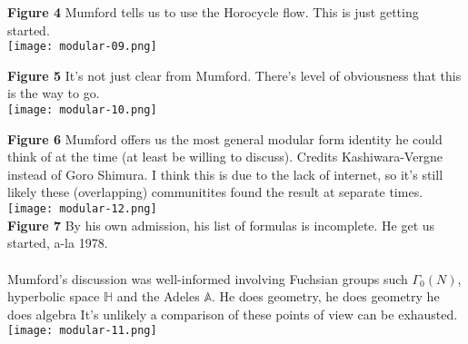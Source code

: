 \documentclass[12pt]{article}
\begin{document}
\noindent \textbf{Figure 4}  Mumford tells us to use the Horocycle flow. This is just getting started. \\
\texttt{[image: modular-09.png]} \\

\newpage

\noindent \textbf{Figure 5} It's not just clear from Mumford.  There's level of obviousness that this is the way to go. \\
\texttt{[image: modular-10.png]} \\

\newpage

\noindent \textbf{Figure 6} Mumford offers us the most general modular form identity he could think of at the time (at least be willing to discuss).  Credits Kashiwara-Vergne instead of Goro Shimura.  I think this is due to the lack of internet, so it's still likely these (overlapping) communitites found the result at separate times.\\
\texttt{[image: modular-12.png]} \\
\noindent \textbf{Figure 7} By his own admission, his list of formulas is incomplete.  He get us started, a-la 1978.  \\ \\ 
Mumford's discussion was well-informed involving Fuchsian groups such $\Gamma_0(N)$, hyperbolic space $\mathbb{H}$ and the Adeles $\mathbb{A}$.  He does geometry, he does geometry he does algebra It's unlikely a comparison of these points of view can be exhausted.\\
\texttt{[image: modular-11.png]} \\
\end{document}
